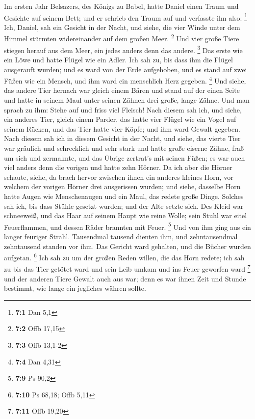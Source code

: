  Im ersten Jahr Belsazers, des Königs zu Babel, hatte
Daniel einen Traum und Gesichte auf seinem Bett; und er schrieb den
Traum auf und verfasste ihn also: \footnote{\textbf{7:1} Dan 5,1}
 Ich, Daniel, sah ein Gesicht in der Nacht, und siehe, die
vier Winde unter dem Himmel stürmten widereinander auf dem großen Meer.
\footnote{\textbf{7:2} Offb 17,15}  Und vier große Tiere
stiegen herauf aus dem Meer, ein jedes anders denn das andere.
\footnote{\textbf{7:3} Offb 13,1-2}  Das erste wie ein
Löwe und hatte Flügel wie ein Adler. Ich sah zu, bis dass ihm die Flügel
ausgerauft wurden; und es ward von der Erde aufgehoben, und es stand auf
zwei Füßen wie ein Mensch, und ihm ward ein menschlich Herz gegeben.
\footnote{\textbf{7:4} Dan 4,31}  Und siehe, das andere
Tier hernach war gleich einem Bären und stand auf der einen Seite und
hatte in seinem Maul unter seinen Zähnen drei große, lange Zähne. Und
man sprach zu ihm: Stehe auf und friss viel Fleisch!  Nach
diesem sah ich, und siehe, ein anderes Tier, gleich einem Parder, das
hatte vier Flügel wie ein Vogel auf seinem Rücken, und das Tier hatte
vier Köpfe; und ihm ward Gewalt gegeben.  Nach diesem sah
ich in diesem Gesicht in der Nacht, und siehe, das vierte Tier war
gräulich und schrecklich und sehr stark und hatte große eiserne Zähne,
fraß um sich und zermalmte, und das Übrige zertrat's mit seinen Füßen;
es war auch viel anders denn die vorigen und hatte zehn Hörner.
 Da ich aber die Hörner schaute, siehe, da brach hervor
zwischen ihnen ein anderes kleines Horn, vor welchem der vorigen Hörner
drei ausgerissen wurden; und siehe, dasselbe Horn hatte Augen wie
Menschenaugen und ein Maul, das redete große Dinge. 
Solches sah ich, bis dass Stühle gesetzt wurden; und der Alte setzte
sich. Des Kleid war schneeweiß, und das Haar auf seinem Haupt wie reine
Wolle; sein Stuhl war eitel Feuerflammen, und dessen Räder brannten mit
Feuer. \footnote{\textbf{7:9} Ps 90,2}  Und von ihm ging
aus ein langer feuriger Strahl. Tausendmal tausend dienten ihm, und
zehntausendmal zehntausend standen vor ihm. Das Gericht ward gehalten,
und die Bücher wurden aufgetan. \footnote{\textbf{7:10} Ps 68,18; Offb
  5,11}  Ich sah zu um der großen Reden willen, die das
Horn redete; ich sah zu bis das Tier getötet ward und sein Leib umkam
und ins Feuer geworfen ward \footnote{\textbf{7:11} Offb 19,20}
 und der anderen Tiere Gewalt auch aus war; denn es war
ihnen Zeit und Stunde bestimmt, wie lange ein jegliches währen sollte.
